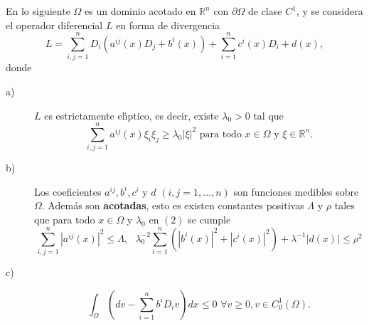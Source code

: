 



En lo siguiente $\Omega$ es un dominio acotado en $\mathbb{R}^{n}$ con
$\partial\Omega$ de clase $C^{1}$, y se considera el operador diferencial $L $
en forma de divergencia
\begin{equation}
L=\sum_{i,j=1}^{n}D_{i}\left(  a^{ij}\left(  x\right)  D_{j}+b^{i}\left(
x\right)  \right)  +\sum_{i=1}^{n}c^{i}\left(  x\right)  D_{i}+d\left(
x\right)  ,\tag{1}%
\end{equation}
donde

\begin{description}
\item[a)] $L$ es estrictamente el\'{\i}ptico, es decir, existe $\lambda_{0}>0$
tal que
\begin{equation}
\sum_{i,j=1}^{n}a^{ij}\left(  x\right)  \xi_{i}\xi_{j}\geq\lambda
_{0}\left\vert \xi\right\vert ^{2}\text{ para todo }x\in\Omega\text{ y }\xi
\in\mathbb{R}^{n}.\tag{2}%
\end{equation}


\item[b)] Los coeficientes $a^{ij},b^{i},c^{i}$ y $d$ $\left(
i,j=1,...,n\right)  $ son funciones medibles sobre $\Omega$. Adem\'{a}s son
\textbf{acotadas}, esto es existen constantes positivas $\Lambda$ y $\rho$
tales que para todo $x\in\Omega$ y $\lambda_{0}$ en $\left(  2\right)  $ se
cumple
\begin{equation}
\sum_{i,j=1}^{n}\left\vert a^{ij}\left(  x\right)  \right\vert ^{2}\leq
\Lambda,\text{ \ }\lambda_{0}^{-2}\sum_{i=1}^{n}\left(  \left\vert
b^{i}\left(  x\right)  \right\vert ^{2}+\left\vert c^{i}\left(  x\right)
\right\vert ^{2}\right)  +\lambda^{-1}\left\vert d\left(  x\right)
\right\vert \leq\rho^{2}\tag{3}%
\end{equation}


\item[c)]
\begin{equation}
\int_{\Omega}\left(  dv-\sum_{i=1}^{n}b^{i}D_{i}v\right)  dx\leq0\text{
\ }\forall v\geq0,v\in C_{0}^{1}\left(  \Omega\right)  .\tag{4}%
\end{equation}

\end{description}


